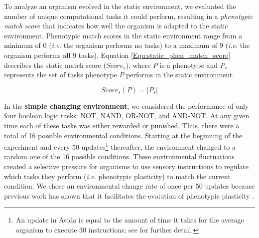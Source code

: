 To analyze an organism evolved in the static environment, we evaluated the number of unique computational tasks it could perform, resulting in a \textit{phenotypic match score} that indicates how well the organism is adapted to the static environment. Phenotypic match scores in the static environment range from a minimum of 0 (\textit{i.e.} the organism performs no tasks) to a maximum of 9 (\textit{i.e.} the organism performs all 9 tasks). %
Equation \ref{Equ:static_phen_match_score} describes the static match score ($Score_s$), where $P$ is a phenotype and $P_s$ represents the set of tasks phenotype $P$ performs in the static environment.

\begin{equation}
Score_s(P) = |P_{s}|
\label{Equ:static_phen_match_score}
\end{equation}

In the \textbf{simple changing environment}, we considered the performance of only four boolean logic tasks: NOT, NAND, OR-NOT, and AND-NOT. At any given time %
each of these tasks was either rewarded or punished. Thus, there were a total of 16 possible environmental conditions. Starting at the beginning of the experiment and every 50
updates\footnote{An update in Avida is equal to the amount of time it takes for the average organism to execute 30 instructions; see \citep{Ofria:2009avida} for further detail.}
thereafter, the environment changed to a random one of the 16 possible conditions. These environmental fluctuations created a selective pressure for organisms to use sensory instructions to regulate which tasks they perform (\textit{i.e.} phenotypic plasticity) to match the current condition. We chose an environmental change rate of once per 50 updates because previous work has shown that it facilitates the evolution of phenotypic plasticity \citep{Lalejini:2016plasticity}.

